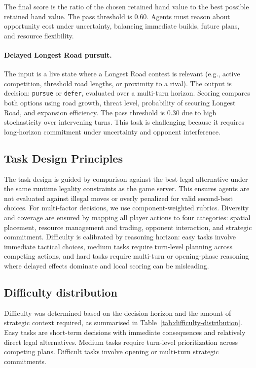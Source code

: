 \documentclass{article}
\begin{document}
The final score is the ratio of the chosen retained hand value to the best possible retained hand value. The pass threshold is 0.60. Agents must reason about opportunity cost under uncertainty, balancing immediate builds, future plans, and resource flexibility.

\paragraph{Delayed Longest Road pursuit.}
The input is a live state where a Longest Road contest is relevant (e.g., active competition, threshold road lengths, or proximity to a rival). The output is decision: \texttt{pursue} or \texttt{defer}, evaluated over a multi-turn horizon. Scoring compares both options using road growth, threat level, probability of securing Longest Road, and expansion efficiency. The pass threshold is 0.30 due to high stochasticity over intervening turns. This task is challenging because it requires long-horizon commitment under uncertainty and opponent interference.

\subsection{Task Design Principles}
\label{sec:design-principles}
The task design is guided by comparison against the best legal alternative under the same runtime legality constraints as the game server. This ensures agents are not evaluated against illegal moves or overly penalized for valid second-best choices. For multi-factor decisions, we use component-weighted rubrics. Diversity and coverage are ensured by mapping all player actions to four categories: spatial placement, resource management and trading, opponent interaction, and strategic commitment. Difficulty is calibrated by reasoning horizon: easy tasks involve immediate tactical choices, medium tasks require turn-level planning across competing actions, and hard tasks require multi-turn or opening-phase reasoning where delayed effects dominate and local scoring can be misleading.

\subsection{Difficulty distribution}
\label{sec:difficulty-distribution}

Difficulty was determined based on the decision horizon and the amount of strategic context required, as summarised in Table~\ref{tab:difficulty-distribution}. Easy tasks are short-term decisions with immediate consequences and relatively direct legal alternatives. Medium tasks require turn-level prioritization across competing plans. Difficult tasks involve opening or multi-turn strategic commitments. 
\end{document}
